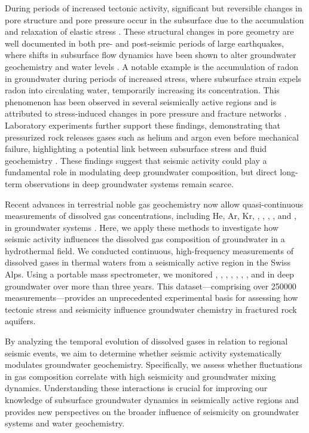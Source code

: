 During periods of increased tectonic activity, significant but reversible changes in pore structure and pore pressure occur in the subsurface due to the accumulation and relaxation of elastic stress \citep{nakagomi2021stress, liu2024opposite}.
These structural changes in pore geometry are well documented in both pre- and post-seismic periods of large earthquakes, where shifts in subsurface flow dynamics have been shown to alter groundwater geochemistry and water levels \citep{won2019response, rutter2016aquifer}.
A notable example is the accumulation of radon in groundwater during periods of increased stress, where subsurface strain expels radon into circulating water, temporarily increasing its concentration.
This phenomenon has been observed in several seismically active regions and is attributed to stress-induced changes in pore pressure and fracture networks \citep{tarakci2014investigation, dincecco2021co2, igarashi1995radon}.
Laboratory experiments further support these findings, demonstrating that pressurized rock releases gases such as helium and argon even before mechanical failure, highlighting a potential link between subsurface stress and fluid geochemistry \citep{honda1982release, bauer2016release, bauer2019release, roques2020helium}.
These findings suggest that seismic activity could play a fundamental role in modulating deep groundwater composition, but direct long-term observations in deep groundwater systems remain scarce.

Recent advances in terrestrial noble gas geochemistry now allow quasi-continuous measurements of dissolved gas concentrations, including He, Ar, Kr, , , , , and , in groundwater systems \citep{brennwald2016portable, giroud2023new}.
Here, we apply these methods to investigate how seismic activity influences the dissolved gas composition of groundwater in a hydrothermal field.
We conducted continuous, high-frequency measurements of dissolved gases in thermal waters from a seismically active region in the Swiss Alps.
Using a portable mass spectrometer, we monitored , , , , , , , and  in deep groundwater over more than three years.
This dataset---comprising over \num{250000} measurements---provides an unprecedented experimental basis for assessing how tectonic stress and seismicity influence groundwater chemistry in fractured rock aquifers.

By analyzing the temporal evolution of dissolved gases in relation to regional seismic events, we aim to determine whether seismic activity systematically modulates groundwater geochemistry.
Specifically, we assess whether fluctuations in gas composition correlate with high seismicity and groundwater mixing dynamics.
Understanding these interactions is crucial for improving our knowledge of subsurface groundwater dynamics in seismically active regions and provides new perspectives on the broader influence of seismicity on groundwater systems and water geochemistry.

